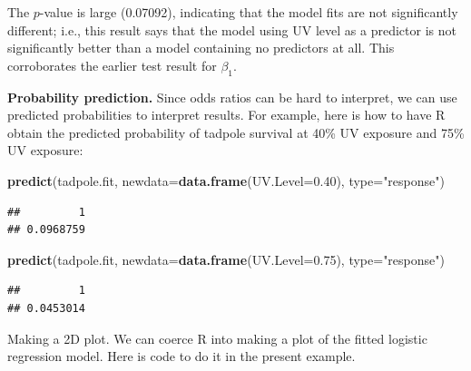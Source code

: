 \documentclass[
]{book}
\newenvironment{Shaded}{\begin{snugshade}}{\end{snugshade}}
\newcommand{\AttributeTok}[1]{\textcolor[rgb]{0.13,0.29,0.53}{#1}}
\newcommand{\FloatTok}[1]{\textcolor[rgb]{0.00,0.00,0.81}{#1}}
\newcommand{\FunctionTok}[1]{\textcolor[rgb]{0.13,0.29,0.53}{\textbf{#1}}}
\newcommand{\NormalTok}[1]{#1}
\newcommand{\StringTok}[1]{\textcolor[rgb]{0.31,0.60,0.02}{#1}}
\begin{document}
The \(p\)-value is large (0.07092), indicating that the model fits are not significantly different; i.e., this result says that the model using UV level as a predictor is not significantly better than a model containing no predictors at all. This corroborates the earlier test result for \(\beta_1\).

\textbf{Probability prediction.} Since odds ratios can be hard to interpret, we can use predicted probabilities to interpret results. For example, here is how to have R obtain the predicted probability of tadpole survival at 40\% UV exposure and 75\% UV exposure:

\begin{Shaded}
\begin{Highlighting}[]
\FunctionTok{predict}\NormalTok{(tadpole.fit, }\AttributeTok{newdata=}\FunctionTok{data.frame}\NormalTok{(}\AttributeTok{UV.Level=}\FloatTok{0.40}\NormalTok{), }\AttributeTok{type=}\StringTok{"response"}\NormalTok{)}
\end{Highlighting}
\end{Shaded}

\begin{verbatim}
##         1 
## 0.0968759
\end{verbatim}

\begin{Shaded}
\begin{Highlighting}[]
\FunctionTok{predict}\NormalTok{(tadpole.fit, }\AttributeTok{newdata=}\FunctionTok{data.frame}\NormalTok{(}\AttributeTok{UV.Level=}\FloatTok{0.75}\NormalTok{), }\AttributeTok{type=}\StringTok{"response"}\NormalTok{)}
\end{Highlighting}
\end{Shaded}

\begin{verbatim}
##         1 
## 0.0453014
\end{verbatim}

Making a 2D plot. We can coerce R into making a plot of the fitted logistic regression model. Here is code to do it in the present example.
\end{document}
